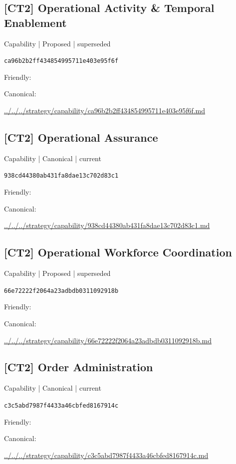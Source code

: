 \documentclass[10pt,a4paper]{article}
\begin{document}
\subsection*{[CT2] Operational Activity \& Temporal Enablement}
{\small Capability | Proposed | superseded}\par
\texttt{ca96b2b2ff434854995711e403e95f6f}\par
Friendly: \par
Canonical: \par
{\footnotesize\url{../../../strategy/capability/ca96b2b2ff434854995711e403e95f6f.md}}\par
\subsection*{[CT2] Operational Assurance}
{\small Capability | Canonical | current}\par
\texttt{938cd44380ab431fa8dae13c702d83c1}\par
Friendly: \par
Canonical: \par
{\footnotesize\url{../../../strategy/capability/938cd44380ab431fa8dae13c702d83c1.md}}\par
\subsection*{[CT2] Operational Workforce Coordination}
{\small Capability | Proposed | superseded}\par
\texttt{66e72222f2064a23adbdb0311092918b}\par
Friendly: \par
Canonical: \par
{\footnotesize\url{../../../strategy/capability/66e72222f2064a23adbdb0311092918b.md}}\par
\subsection*{[CT2] Order Administration}
{\small Capability | Canonical | current}\par
\texttt{c3c5abd7987f4433a46cbfed8167914c}\par
Friendly: \par
Canonical: \par
{\footnotesize\url{../../../strategy/capability/c3c5abd7987f4433a46cbfed8167914c.md}}\par
\end{document}
